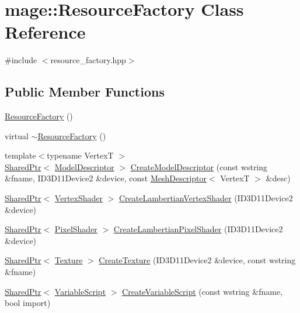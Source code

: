 \hypertarget{classmage_1_1_resource_factory}{}\section{mage\+:\+:Resource\+Factory Class Reference}
\label{classmage_1_1_resource_factory}


{\ttfamily \#include $<$resource\+\_\+factory.\+hpp$>$}

\subsection*{Public Member Functions}
\begin{DoxyCompactItemize}
\item 
\hyperlink{classmage_1_1_resource_factory_a340bde81096427e319b60063ae771a0d}{Resource\+Factory} ()
\item 
virtual \hyperlink{classmage_1_1_resource_factory_a58764dea5d6cd05405bd62366cc25681}{$\sim$\+Resource\+Factory} ()
\item 
{\footnotesize template$<$typename VertexT $>$ }\\\hyperlink{namespacemage_a1e01ae66713838a7a67d30e44c67703e}{Shared\+Ptr}$<$ \hyperlink{classmage_1_1_model_descriptor}{Model\+Descriptor} $>$ \hyperlink{classmage_1_1_resource_factory_a7e669ea18fa558ba6f794bdf5cd209fe}{Create\+Model\+Descriptor} (const wstring \&fname, I\+D3\+D11\+Device2 \&device, const \hyperlink{structmage_1_1_mesh_descriptor}{Mesh\+Descriptor}$<$ VertexT $>$ \&desc)
\item 
\hyperlink{namespacemage_a1e01ae66713838a7a67d30e44c67703e}{Shared\+Ptr}$<$ \hyperlink{classmage_1_1_vertex_shader}{Vertex\+Shader} $>$ \hyperlink{classmage_1_1_resource_factory_a9cbe973114ec5a4bd16ecf7829bcd26a}{Create\+Lambertian\+Vertex\+Shader} (I\+D3\+D11\+Device2 \&device)
\item 
\hyperlink{namespacemage_a1e01ae66713838a7a67d30e44c67703e}{Shared\+Ptr}$<$ \hyperlink{classmage_1_1_pixel_shader}{Pixel\+Shader} $>$ \hyperlink{classmage_1_1_resource_factory_a4d6f68f3bf0fae659f9b7734e8428d31}{Create\+Lambertian\+Pixel\+Shader} (I\+D3\+D11\+Device2 \&device)
\item 
\hyperlink{namespacemage_a1e01ae66713838a7a67d30e44c67703e}{Shared\+Ptr}$<$ \hyperlink{classmage_1_1_texture}{Texture} $>$ \hyperlink{classmage_1_1_resource_factory_aa705b55d95fe90edb86e84594e0d85d4}{Create\+Texture} (I\+D3\+D11\+Device2 \&device, const wstring \&fname)
\item 
\hyperlink{namespacemage_a1e01ae66713838a7a67d30e44c67703e}{Shared\+Ptr}$<$ \hyperlink{classmage_1_1_variable_script}{Variable\+Script} $>$ \hyperlink{classmage_1_1_resource_factory_a523e3f76a3d8347f6d75a7b87a291b1e}{Create\+Variable\+Script} (const wstring \&fname, bool import)
\end{DoxyCompactItemize}
